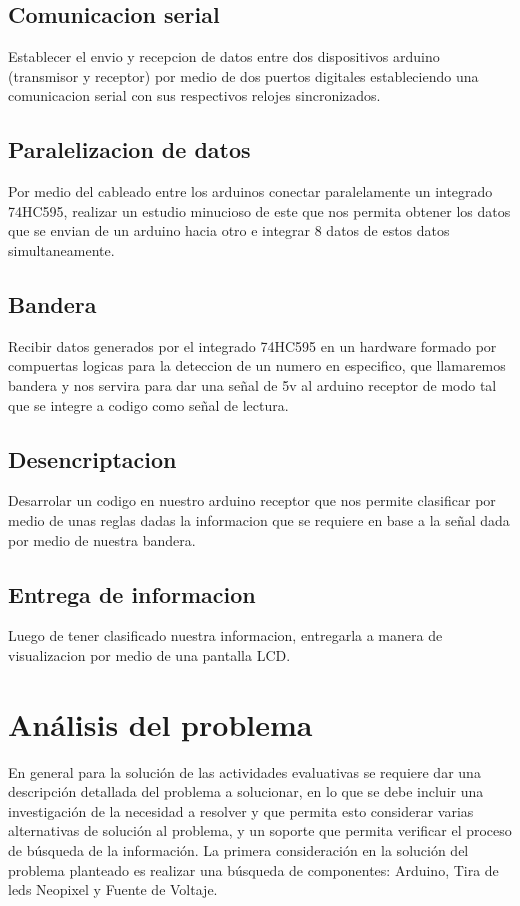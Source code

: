 \documentclass{article}
\begin{document}
\subsection{Comunicacion serial}
Establecer el envio y recepcion de datos entre dos dispositivos arduino (transmisor y receptor) por medio de dos puertos digitales estableciendo una comunicacion serial con sus respectivos relojes sincronizados.

\subsection{Paralelizacion de datos}
Por medio del cableado entre los arduinos conectar paralelamente un integrado 74HC595, realizar un estudio minucioso de este que nos permita obtener los datos que se envian de un arduino hacia otro e integrar 8 datos de estos datos simultaneamente.

\subsection{Bandera}
Recibir datos generados por el integrado 74HC595 en un hardware formado por compuertas logicas para la deteccion de un numero en especifico, que llamaremos bandera y nos servira para dar una señal de 5v al arduino receptor de modo tal que se integre a codigo como señal de lectura.

\subsection{Desencriptacion}
Desarrolar un codigo en nuestro arduino receptor que nos permite clasificar por medio de unas reglas dadas la informacion que se requiere en base a la señal dada por medio de nuestra bandera.

\subsection{Entrega de informacion}
Luego de tener clasificado nuestra informacion, entregarla a manera de visualizacion por medio de una pantalla LCD.

\newpage
\section{Análisis del problema}\label{intro}
En general para la solución de las actividades evaluativas se requiere dar una descripción detallada del problema a solucionar, en lo que se debe incluir una investigación de la necesidad a resolver y que permita esto considerar varias alternativas de solución al problema, y un soporte que permita verificar el proceso de búsqueda de la información.\newline
La primera consideración en la solución del problema planteado es realizar una búsqueda de componentes: Arduino, Tira de leds Neopixel y Fuente de Voltaje.
\end{document}
